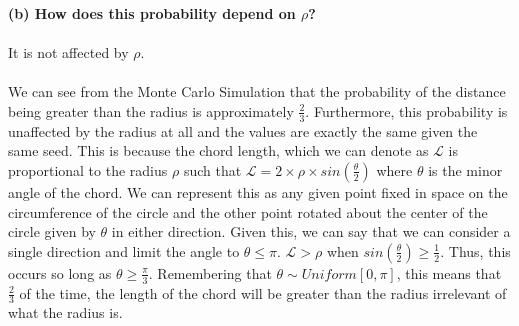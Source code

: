 \textbf{(b) How does this probability depend on $\rho$?\\\\}
It is not affected by $\rho$.\\\\
We can see from the Monte Carlo Simulation that the probability of the distance being greater than the radius is approximately $\frac{2}{3}$. Furthermore, this probability is unaffected by the radius at all and the values are exactly the same given the same seed. This is because the chord length, which we can denote as $\mathcal{L}$ is proportional to the radius $\rho$ such that $\mathcal{L} = 2\times\rho\times sin(\frac{\theta}{2})$ where $\theta$ is the minor angle of the chord. We can represent this as any given point fixed in space on the circumference of the circle and the other point rotated about the center of the circle given by $\theta$ in either direction. Given this, we can say that we can consider a single direction and limit the angle to $\theta \leq \pi$. $\mathcal{L} > \rho $ when $sin(\frac{\theta}{2}) \geq \frac{1}{2}$. Thus, this occurs so long as $\theta \geq \frac{\pi}{3}$. Remembering that $\theta \sim  Uniform[0, \pi]$, this means that $\frac{2}{3}$ of the time, the length of the chord will be greater than the radius irrelevant of what the radius is.\\\\